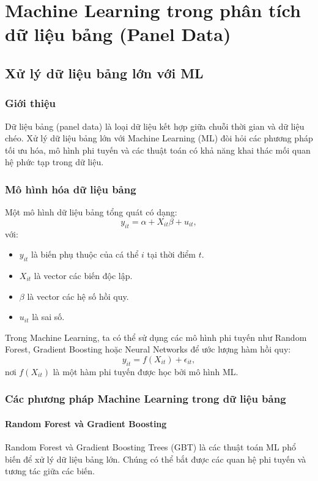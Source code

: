 \chapter{Machine Learning trong phân tích dữ liệu bảng (Panel Data)}
\section{Xử lý dữ liệu bảng lớn với ML}
\subsection{Giới thiệu}
Dữ liệu bảng (panel data) là loại dữ liệu kết hợp giữa chuỗi thời gian và dữ liệu chéo. Xử lý dữ liệu bảng lớn với Machine Learning (ML) đòi hỏi các phương pháp tối ưu hóa, mô hình phi tuyến và các thuật toán có khả năng khai thác mối quan hệ phức tạp trong dữ liệu.

\subsection{Mô hình hóa dữ liệu bảng}
Một mô hình dữ liệu bảng tổng quát có dạng:
\begin{equation}
    y_{it} = \alpha + X_{it} \beta + u_{it},
\end{equation}
với:
\begin{itemize}
    \item $y_{it}$ là biến phụ thuộc của cá thể $i$ tại thời điểm $t$.
    \item $X_{it}$ là vector các biến độc lập.
    \item $\beta$ là vector các hệ số hồi quy.
    \item $u_{it}$ là sai số.
\end{itemize}

Trong Machine Learning, ta có thể sử dụng các mô hình phi tuyến như Random Forest, Gradient Boosting hoặc Neural Networks để ước lượng hàm hồi quy:
\begin{equation}
    y_{it} = f(X_{it}) + \epsilon_{it},
\end{equation}
nơi $f(X_{it})$ là một hàm phi tuyến được học bởi mô hình ML.

\subsection{Các phương pháp Machine Learning trong dữ liệu bảng}
\subsubsection{Random Forest và Gradient Boosting}
Random Forest và Gradient Boosting Trees (GBT) là các thuật toán ML phổ biến để xử lý dữ liệu bảng lớn. Chúng có thể bắt được các quan hệ phi tuyến và tương tác giữa các biến.


